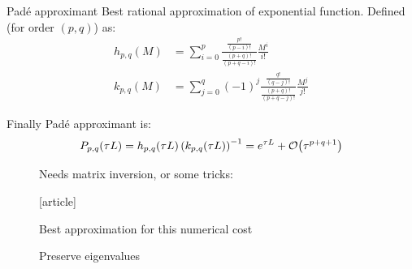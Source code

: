 \documentclass{beamer}
\newcommand{\cmark}{{\color{dgreen}\ding{52}}}
\newcommand{\xmark}{{\color{red}\ding{55}}}
\newcommand{\customcite}[1]{\cite{#1}}
\begin{document}
\begin{frame}{Padé approximant}
  Best rational approximation of exponential function. Defined (for order $(p,q)$) as:
  $$
    \begin{aligned}
      h_{p,q}(M) & = \sum_{i=0}^p        \frac{\frac{p!}{(p-i)!}}{\frac{(p+q)!}{(p+q-i)!}} \frac{M^i}{i!} \\
      k_{p,q}(M) & = \sum_{j=0}^q (-1)^j \frac{\frac{q!}{(q-j)!}}{\frac{(p+q)!}{(p+q-j)!}} \frac{M^j}{j!}
    \end{aligned}
  $$

  Finally Padé approximant is:
  $$
    P_{p,q}(\tau L) = h_{p,q}(\tau L)\left( k_{p,q}(\tau L) \right)^{-1} = e^{\tau L} + \order{\tau^{p+q+1}}
  $$

  \begin{description}
    \item[\xmark] Needs matrix inversion, or some tricks:
    \begin{thebibliography}{9}
      [article]
     \customcite{Li:2011}
  \end{thebibliography}
    \item[\cmark] Best approximation for this numerical cost
    \item[\cmark] Preserve eigenvalues
  \end{description}
\end{frame}
\end{document}
